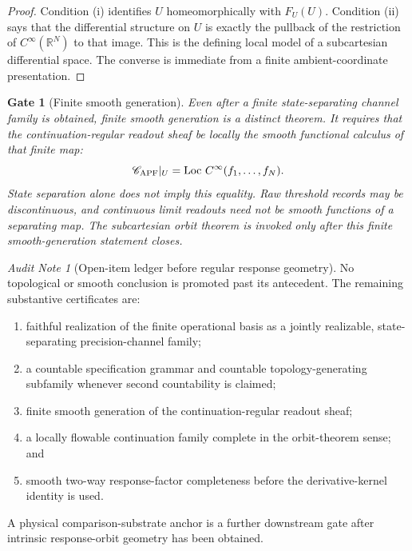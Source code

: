 \documentclass[11pt]{article}
\newtheorem{gate}[theorem]{Gate}
\theoremstyle{remark}
\newtheorem{audit}[theorem]{Audit Note}
\begin{document}
\begin{proof}
Condition (i) identifies $U$ homeomorphically with $F_U(U)$.  Condition (ii)
says that the differential structure on $U$ is exactly the pullback of the
restriction of $C^\infty(\mathbb R^N)$ to that image.  This is the defining
local model of a subcartesian differential space.  The converse is immediate
from a finite ambient-coordinate presentation.
\end{proof}

\begin{gate}[Finite smooth generation]
\label{gate:finite-differential-sufficiency}
Even after a finite state-separating channel family is obtained, finite smooth
generation is a distinct theorem. It requires that the continuation-regular
readout sheaf be locally the smooth functional calculus of that finite map:
\[
\mathscr C_{\rm APF}|_U
=\operatorname{Loc}\,C^\infty(f_1,\ldots,f_N).
\]
State separation alone does not imply this equality. Raw threshold records may
be discontinuous, and continuous limit readouts need not be smooth functions of
a separating map. The subcartesian orbit theorem is invoked only after this
finite smooth-generation statement closes.
\end{gate}

\begin{audit}[Open-item ledger before regular response geometry]
No topological or smooth conclusion is promoted past its antecedent.  The
remaining substantive certificates are:
\begin{enumerate}[label=(\roman*)]
\item faithful realization of the finite operational basis as a jointly
realizable, state-separating precision-channel family;
\item a countable specification grammar and countable topology-generating
subfamily whenever second countability is claimed;
\item finite smooth generation of the continuation-regular readout sheaf;
\item a locally flowable continuation family complete in the orbit-theorem
sense; and
\item smooth two-way response-factor completeness before the derivative-kernel
identity is used.
\end{enumerate}
A physical comparison-substrate anchor is a further downstream gate after
intrinsic response-orbit geometry has been obtained.
\end{audit}
\end{document}
